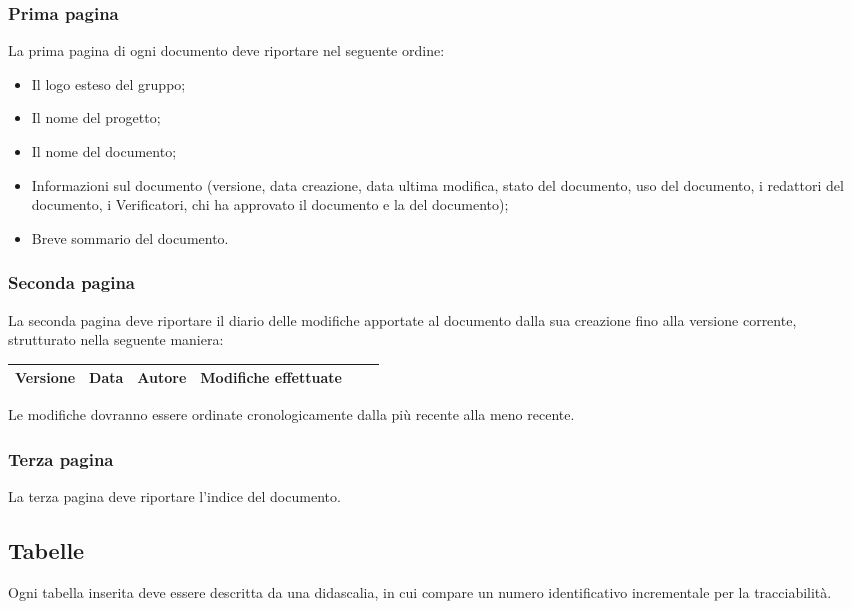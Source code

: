 \subsubsection{Prima pagina}
\label{5.2.3}
La prima pagina di ogni documento deve riportare nel seguente ordine:
\begin{itemize}
\item Il logo esteso del gruppo;
\item Il nome del progetto;
\item Il nome del documento;
\item Informazioni sul documento (versione, data creazione, data ultima modifica, stato del documento, uso del documento, i redattori del documento, i Verificatori, chi ha approvato il documento e la  del documento);
\item Breve sommario del documento.
\end{itemize}

\subsubsection{Seconda pagina}
\label{5.2.4}
La seconda pagina deve riportare il diario delle modifiche apportate al documento dalla sua creazione fino alla versione corrente, strutturato nella seguente maniera:

\begin{center}
\begin{longtable}{|c|c|c|p{0.5\linewidth}|}
\toprule
\textbf{Versione} & \textbf{Data} & \textbf{Autore} & \textbf{Modifiche effettuate}\\

\bottomrule
\end{longtable}
\end{center}
Le modifiche dovranno essere ordinate cronologicamente dalla più recente alla meno recente.


\subsubsection{Terza pagina}
\label{5.2.5}
La terza pagina deve riportare l'indice del documento.

\subsection{Tabelle}
Ogni tabella inserita deve essere descritta da una didascalia, in cui compare un numero identificativo incrementale per la tracciabilità.

